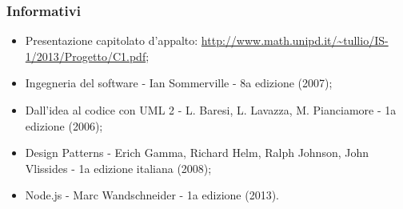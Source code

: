 		\subsubsection{Informativi}

		\begin{itemize}
		\item Presentazione capitolato d'appalto: \url{http://www.math.unipd.it/~tullio/IS-1/2013/Progetto/C1.pdf};
		\item Ingegneria del software - Ian Sommerville - 8a edizione (2007);
		\item Dall’idea al codice con UML 2 - L. Baresi, L. Lavazza, M. Pianciamore - 1a edizione
(2006);
		\item Design Patterns - Erich Gamma, Richard Helm, Ralph Johnson, John Vlissides - 1a edizione italiana (2008);
		\item Node.js - Marc Wandschneider - 1a edizione (2013).
		
		\end{itemize}
		
	\pagebreak
